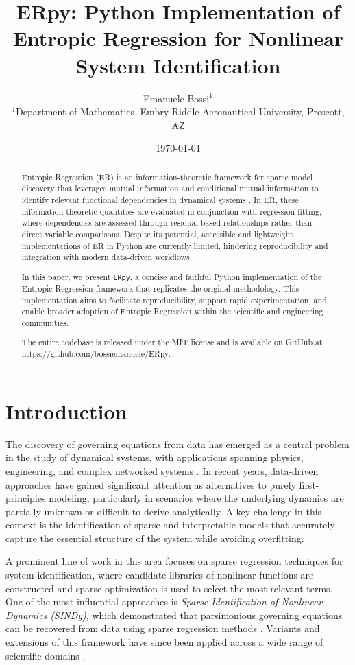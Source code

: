 \documentclass[11pt]{article}
\title{\textbf{ERpy: Python Implementation of Entropic Regression for Nonlinear System Identification}}
\author{
Emanuele Bossi$^{1}$\\[6pt]
\small $^{1}$Department of Mathematics, Embry-Riddle Aeronautical University, Prescott, AZ
}
\date{\today}
\begin{document}
\maketitle

\begin{abstract}
Entropic Regression (ER) is an information-theoretic framework for sparse model discovery that leverages mutual information and conditional mutual information to identify relevant functional dependencies in dynamical systems \cite{almomani2020entropic}. In ER, these information-theoretic quantities are evaluated in conjunction with regression fitting, where dependencies are assessed through residual-based relationships rather than direct variable comparisons. Despite its potential, accessible and lightweight implementations of ER in Python are currently limited, hindering reproducibility and integration with modern data-driven workflows.

In this paper, we present \texttt{ERpy}, a concise and faithful Python implementation of the Entropic Regression framework that replicates the original methodology. This implementation aims to facilitate reproducibility, support rapid experimentation, and enable broader adoption of Entropic Regression within the scientific and engineering communities.

The entire codebase is released under the MIT license and is available on GitHub at \url{https://github.com/bossiemanuele/ERpy}.

\end{abstract}

\section{Introduction} \label{section1}
The discovery of governing equations from data has emerged as a central problem in the study of dynamical systems, with applications spanning physics, engineering, and complex networked systems \cite{brunton2022modern}. In recent years, data-driven approaches have gained significant attention as alternatives to purely first-principles modeling, particularly in scenarios where the underlying dynamics are partially unknown or difficult to derive analytically. A key challenge in this context is the identification of sparse and interpretable models that accurately capture the essential structure of the system while avoiding overfitting.

A prominent line of work in this area focuses on sparse regression techniques for system identification, where candidate libraries of nonlinear functions are constructed and sparse optimization is used to select the most relevant terms. One of the most influential approaches is \emph{Sparse Identification of Nonlinear Dynamics (SINDy)}, which demonstrated that parsimonious governing equations can be recovered from data using sparse regression methods \cite{brunton2016discovering}. Variants and extensions of this framework have since been applied across a wide range of scientific domains \cite{kaiser2018sindy}.
\end{document}
